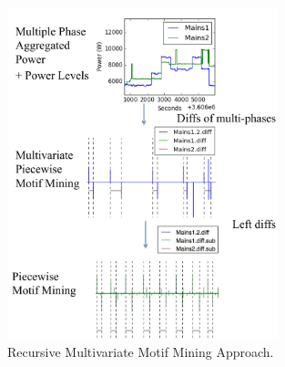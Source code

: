 \begin{figure}[h]
\centering
\includegraphics[width=0.7\textwidth]{multidisaggfig/RecursiveMultivariateMotifMining.pdf}
\caption{Recursive Multivariate Motif Mining Approach.}
\label{fig_multivariateMotifming}
\end{figure} 
